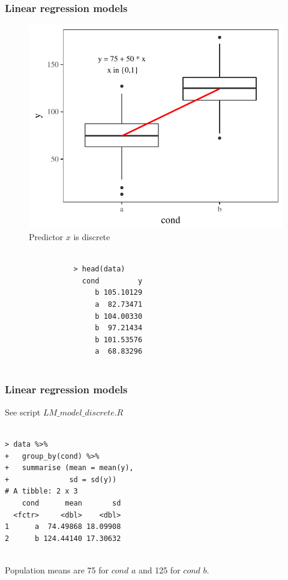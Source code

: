 \begin{frame}[fragile]
	\frametitle{Linear regression models}

	\begin{minipage}{.55\textwidth}	
	\begin{figure}		
		\includegraphics[scale= .5]{gfx/lmdiscrete.pdf}
		\caption{Predictor $x$ is discrete}
	\end{figure}
	\end{minipage}
	\hfill
	\begin{minipage}{.35\textwidth}
		\begin{verbatim}

				> head(data)
				  cond         y
				     b 105.10129
				     a  82.73471
				     b 104.00330
				     b  97.21434
				     b 101.53576
				     a  68.83296
		
			\end{verbatim}
		\end{minipage}

	
\end{frame}


\begin{frame}[fragile]
	\frametitle{Linear regression models}
	See script $LM\_model\_discrete.R$
	\begin{verbatim}
	
> data %>% 
+   group_by(cond) %>%
+   summarise (mean = mean(y),
+              sd = sd(y))
# A tibble: 2 x 3
    cond      mean       sd
  <fctr>     <dbl>    <dbl>
1      a  74.49868 18.09908
2      b 124.44140 17.30632
	
	\end{verbatim}
	Population means are 75 for $cond$ $a$ and 125 for $cond$ $b$.
	
\end{frame}

